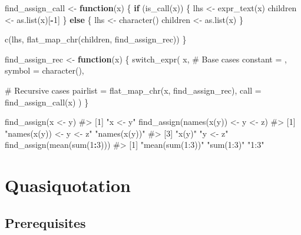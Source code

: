 \documentclass[
]{krantz}
\makeatletter
\newenvironment{Shaded}{\begin{snugshade}}{\end{snugshade}}
\newcommand{\CommentTok}[1]{\textcolor[rgb]{0.56,0.35,0.01}{\textit{#1}}}
\newcommand{\ControlFlowTok}[1]{\textcolor[rgb]{0.13,0.29,0.53}{\textbf{#1}}}
\newcommand{\DataTypeTok}[1]{\textcolor[rgb]{0.13,0.29,0.53}{#1}}
\newcommand{\DecValTok}[1]{\textcolor[rgb]{0.00,0.00,0.81}{#1}}
\newcommand{\KeywordTok}[1]{\textcolor[rgb]{0.13,0.29,0.53}{\textbf{#1}}}
\newcommand{\NormalTok}[1]{#1}
\newcommand{\OperatorTok}[1]{\textcolor[rgb]{0.81,0.36,0.00}{\textbf{#1}}}
\newcommand{\StringTok}[1]{\textcolor[rgb]{0.31,0.60,0.02}{#1}}
\newenvironment{kframe}{%
\medskip{}
\setlength{\fboxsep}{.8em}
 \def\at@end@of@kframe{}%
 \ifinner\ifhmode%
  \def\at@end@of@kframe{\end{minipage}}%
  \begin{minipage}{\columnwidth}%
 \fi\fi%
 \def\FrameCommand##1{\hskip\@totalleftmargin \hskip-\fboxsep
 \colorbox{shadecolor}{##1}\hskip-\fboxsep
     \hskip-\linewidth \hskip-\@totalleftmargin \hskip\columnwidth}%
 \MakeFramed {\advance\hsize-\width
   \@totalleftmargin\z@ \linewidth\hsize
   \@setminipage}}%
 {\par\unskip\endMakeFramed%
 \at@end@of@kframe}
\renewenvironment{Shaded}{\begin{kframe}}{\end{kframe}}
\renewcommand{\KeywordTok} [1]{\textcolor[rgb]{0.00,0.44,0.13}{{#1}}}
\renewcommand{\DataTypeTok}[1]{\textcolor[rgb]{0.56,0.13,0.00}{{#1}}}
\renewcommand{\DecValTok}  [1]{\textcolor[rgb]{0.25,0.63,0.44}{{#1}}}
\renewcommand{\StringTok}  [1]{\textcolor[rgb]{0.25,0.44,0.63}{{#1}}}
\renewcommand{\CommentTok} [1]{\textcolor[rgb]{0.38,0.63,0.69}{{#1}}}
\renewcommand{\NormalTok}  [1]{{#1}}
\makeatother
\begin{document}
\begin{Shaded}
\begin{Highlighting}[]
\NormalTok{find_assign_call <-}\StringTok{ }\ControlFlowTok{function}\NormalTok{(x) \{}
  \ControlFlowTok{if}\NormalTok{ (}\KeywordTok{is_call}\NormalTok{(x)) \{}
\NormalTok{    lhs <-}\StringTok{ }\KeywordTok{expr_text}\NormalTok{(x)}
\NormalTok{    children <-}\StringTok{ }\KeywordTok{as.list}\NormalTok{(x)[}\OperatorTok{-}\DecValTok{1}\NormalTok{]}
\NormalTok{  \} }\ControlFlowTok{else}\NormalTok{ \{}
\NormalTok{    lhs <-}\StringTok{ }\KeywordTok{character}\NormalTok{()}
\NormalTok{    children <-}\StringTok{ }\KeywordTok{as.list}\NormalTok{(x)}
\NormalTok{  \}}
  
  \KeywordTok{c}\NormalTok{(lhs, }\KeywordTok{flat_map_chr}\NormalTok{(children, find_assign_rec))}
\NormalTok{\}}

\NormalTok{find_assign_rec <-}\StringTok{ }\ControlFlowTok{function}\NormalTok{(x) \{}
  \KeywordTok{switch_expr}\NormalTok{(}
\NormalTok{    x,}
    \CommentTok{# Base cases}
    \DataTypeTok{constant =}\NormalTok{ ,}
    \DataTypeTok{symbol =} \KeywordTok{character}\NormalTok{(),}

    \CommentTok{# Recursive cases}
    \DataTypeTok{pairlist =} \KeywordTok{flat_map_chr}\NormalTok{(x, find_assign_rec),}
    \DataTypeTok{call =} \KeywordTok{find_assign_call}\NormalTok{(x)}
\NormalTok{  )}
\NormalTok{\}}

\KeywordTok{find_assign}\NormalTok{(x <-}\StringTok{ }\NormalTok{y)}
\CommentTok{#> [1] "x <- y"}
\KeywordTok{find_assign}\NormalTok{(}\KeywordTok{names}\NormalTok{(}\KeywordTok{x}\NormalTok{(y)) <-}\StringTok{ }\NormalTok{y <-}\StringTok{ }\NormalTok{z)}
\CommentTok{#> [1] "names(x(y)) <- y <- z" "names(x(y))"          }
\CommentTok{#> [3] "x(y)"                  "y <- z"}
\KeywordTok{find_assign}\NormalTok{(}\KeywordTok{mean}\NormalTok{(}\KeywordTok{sum}\NormalTok{(}\DecValTok{1}\OperatorTok{:}\DecValTok{3}\NormalTok{)))}
\CommentTok{#> [1] "mean(sum(1:3))" "sum(1:3)"       "1:3"}
\end{Highlighting}
\end{Shaded}

\hypertarget{quasiquotation}{%
\chapter{Quasiquotation}\label{quasiquotation}}

\hypertarget{prerequisites-10}{%
\section*{Prerequisites}\label{prerequisites-10}}
\end{document}
